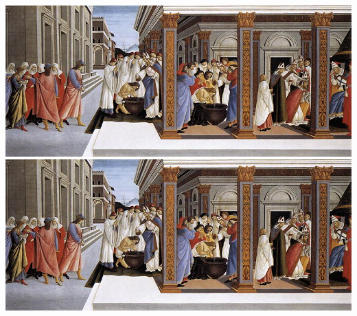 \documentclass{book}
\makeatletter
\newcommand{\cleartoevenpage}{%
  \clearpage%
  \ifoddpage\c@page\hbox{}\clearpage\fi}
\makeatother
\begin{document}
\cleartoevenpage
\includegraphics[height=0.5\textheight]{zenobius}
\newpage
\hspace*{-\textwidth}\includegraphics[height=0.5\textheight]{zenobius}\hspace{1em}
\endminipage
\end{document}

